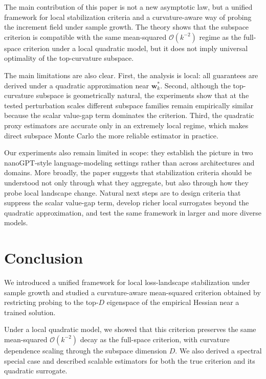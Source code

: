 \documentclass[10pt]{article}
\theoremstyle{plain}
\theoremstyle{remark}
\begin{document}
The main contribution of this paper is not a new asymptotic law, but a unified framework for local stabilization criteria and a curvature-aware way of probing the increment field under sample growth.
The theory shows that the subspace criterion is compatible with the same mean-squared $\mathcal O(k^{-2})$ regime as the full-space criterion under a local quadratic model, but it does not imply universal optimality of the top-curvature subspace.

The main limitations are also clear.
First, the analysis is local: all guarantees are derived under a quadratic approximation near $\mathbf w_k^*$.
Second, although the top-curvature subspace is geometrically natural, the experiments show that at the tested perturbation scales different subspace families remain empirically similar because the scalar value-gap term dominates the criterion.
Third, the quadratic proxy estimators are accurate only in an extremely local regime, which makes direct subspace Monte Carlo the more reliable estimator in practice.

Our experiments also remain limited in scope: they establish the picture in two nanoGPT-style language-modeling settings rather than across architectures and domains.
More broadly, the paper suggests that stabilization criteria should be understood not only through what they aggregate, but also through how they probe local landscape change.
Natural next steps are to design criteria that suppress the scalar value-gap term, develop richer local surrogates beyond the quadratic approximation, and test the same framework in larger and more diverse models.

\section{Conclusion}
\label{sec:conclusion}

We introduced a unified framework for local loss-landscape stabilization under sample growth and studied a curvature-aware mean-squared criterion obtained by restricting probing to the top-$D$ eigenspace of the empirical Hessian near a trained solution.

Under a local quadratic model, we showed that this criterion preserves the same mean-squared $\mathcal O(k^{-2})$ decay as the full-space criterion, with curvature dependence scaling through the subspace dimension $D$.
We also derived a spectral special case and described scalable estimators for both the true criterion and its quadratic surrogate.
\end{document}
